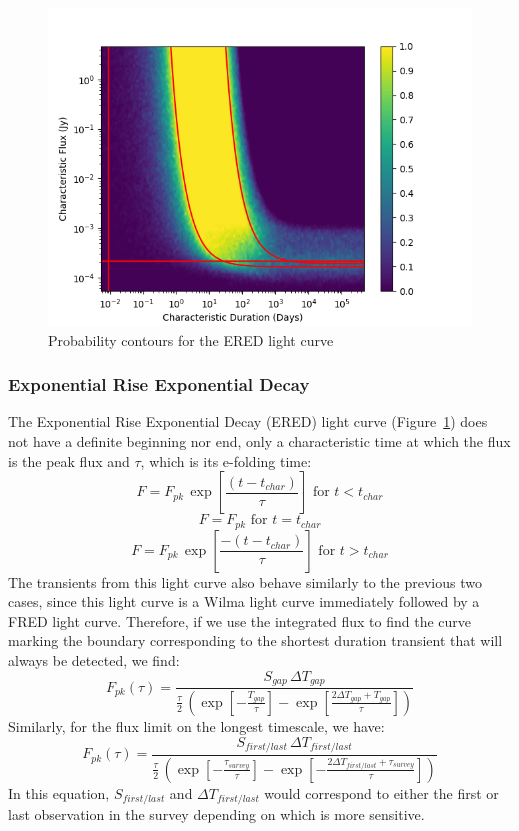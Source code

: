 \documentclass[12pt]{article}
\begin{document}
\begin{figure}
\includegraphics[width=\columnwidth]{ered.png}
\caption{Probability contours for the ERED light curve}
\label{ered}
 \end{figure}
 
\subsubsection{Exponential Rise Exponential Decay}
The Exponential Rise Exponential Decay (ERED) light curve (Figure~\ref{ered}) does not have a definite beginning nor end, only a characteristic time at which the flux is the peak flux and $\tau$, which is its e-folding time:
\[F=F_{pk}\,\exp\left[{\frac{(t-t_{char})}{\tau}}\right]\text{ for }t< t_{char}\]
\[F=F_{pk}\text{ for }t=t_{char}\]
\[F=F_{pk}\,\exp\left[{\frac{-(t-t_{char})}{\tau}}\right]\text{ for }t> t_{char}\]
The transients from this light curve also behave similarly to the previous two cases, since this light curve is a Wilma light curve immediately followed by a FRED light curve.  Therefore, if we use the integrated flux to find the curve marking the boundary corresponding to the shortest duration transient that will always be detected, we find:
\[F_{pk}(\tau) = \frac{ S _{gap}\,\Delta T_{gap}}{\frac{\tau}{2}\,\left(\exp\left[-\frac{T_{gap}}{\tau}\right] - \exp\left[\frac{2\Delta T_{gap} + T_{gap}}{\tau}\right]\right)}\]
Similarly, for the flux limit on the longest timescale, we have:
\[F_{pk}(\tau) = \frac{S_{first/last}\,\Delta T_{first/last}}{\frac{\tau}{2}\,\left(\exp\left[-\frac{\tau_{survey}}{\tau}\right] - \exp\left[-\frac{2\Delta T_{first/last} + \tau_{survey}}{\tau}\right]\right)}\]
In this equation, $S_{first/last}$ and $\Delta T_{first/last}$ would correspond to either the first or last observation in the survey depending on which is more sensitive. 
\end{document}
